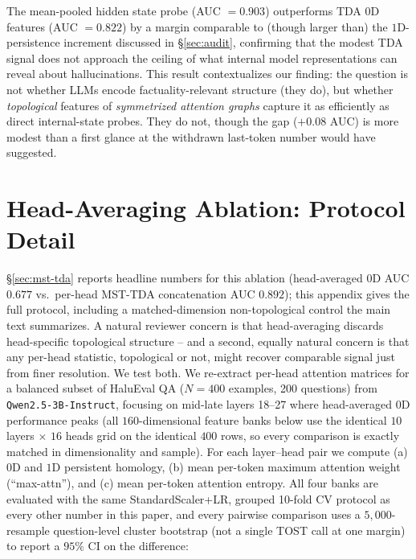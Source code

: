 \documentclass{article}
\begin{document}
The mean-pooled hidden state probe (AUC $= 0.903$) outperforms TDA 0D features (AUC $= 0.822$) by a
margin comparable to (though larger than) the $1$D-persistence increment discussed in
\S\ref{sec:audit}, confirming that the modest TDA signal does not approach the ceiling of what
internal model representations can reveal about hallucinations. This result contextualizes our
finding: the question is not whether LLMs encode factuality-relevant structure (they do), but whether
\emph{topological} features of \emph{symmetrized attention graphs} capture it as efficiently as direct
internal-state probes. They do not, though the gap ($+0.08$ AUC) is more modest than a first glance at
the withdrawn last-token number would have suggested.


\section{Head-Averaging Ablation: Protocol Detail}
\label{app:perhead}

\S\ref{sec:mst-tda} reports headline numbers for this ablation (head-averaged $0$D AUC $0.677$ vs.\ per-head MST-TDA concatenation AUC $0.892$); this appendix gives the full protocol, including a matched-dimension non-topological control the main text summarizes. A natural reviewer concern is that head-averaging discards head-specific topological structure -- and a second, equally natural concern is that any per-head statistic, topological or not, might recover comparable signal just from finer resolution. We test both. We re-extract per-head attention matrices for a balanced subset of HaluEval QA ($N=400$ examples, 200 questions) from \texttt{Qwen2.5-3B-Instruct}, focusing on mid-late layers 18--27 where head-averaged $0$D performance peaks (all $160$-dimensional feature banks below use the identical $10$ layers $\times$ $16$ heads grid on the identical $400$ rows, so every comparison is exactly matched in dimensionality and sample). For each layer--head pair we compute (a) $0$D and $1$D persistent homology, (b) mean per-token maximum attention weight (``max-attn''), and (c) mean per-token attention entropy. All four banks are evaluated with the same StandardScaler+LR, grouped 10-fold CV protocol as every other number in this paper, and every pairwise comparison uses a $5{,}000$-resample question-level cluster bootstrap (not a single TOST call at one margin) to report a $95\%$ CI on the difference:
\end{document}
